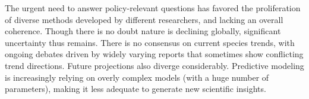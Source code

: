 \documentclass[11pt]{article}
\begin{document}
The urgent need to answer policy-relevant questions has favored the proliferation of diverse methods developed by different researchers, and lacking an overall coherence. Though there is no doubt nature is declining globally, significant uncertainty thus remains. There is no consensus on current species trends, with ongoing debates driven by widely varying reports that sometimes show conflicting trend directions. Future projections also diverge considerably. Predictive modeling is increasingly relying on overly complex models (with a huge number of parameters), making it less adequate to generate new scientific insights.

\end{document}
